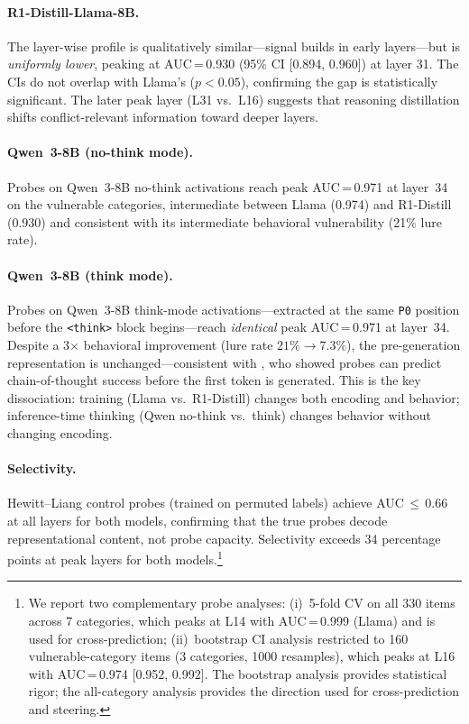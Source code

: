 \documentclass[accepted]{article}
\newcommand{\pzero}{\texttt{P0}}
\begin{document}
\paragraph{R1-Distill-Llama-8B.}  The layer-wise profile is qualitatively
similar---signal builds in early layers---but is \emph{uniformly lower},
peaking at AUC\,=\,0.930 (95\% CI [0.894, 0.960]) at layer 31.  The CIs
do not overlap with Llama's ($p < 0.05$), confirming the gap is
statistically significant.  The later peak layer (L31 vs.\ L16) suggests
that reasoning distillation shifts conflict-relevant information toward
deeper layers.

\paragraph{Qwen~3-8B (no-think mode).}  Probes on Qwen~3-8B no-think
activations reach peak AUC\,=\,0.971 at layer~34 on the vulnerable
categories, intermediate between Llama (0.974) and R1-Distill (0.930)
and consistent with its intermediate behavioral vulnerability (21\% lure
rate).

\paragraph{Qwen~3-8B (think mode).}  Probes on Qwen~3-8B think-mode
activations---extracted at the same \pzero{} position before the
\texttt{<think>} block begins---reach \emph{identical} peak
AUC\,=\,0.971 at layer~34.  Despite a 3$\times$ behavioral improvement
(lure rate $21\% \to 7.3\%$), the pre-generation representation is
unchanged---consistent with \citet{afzal2025knowing}, who showed probes
can predict chain-of-thought success before the first token is generated.
This is the key dissociation: training (Llama vs.\ R1-Distill)
changes both encoding and behavior; inference-time thinking (Qwen no-think
vs.\ think) changes behavior without changing encoding.

\paragraph{Selectivity.}  Hewitt--Liang control probes (trained on
permuted labels) achieve AUC\,$\leq$\,0.66 at all layers for both models,
confirming that the true probes decode representational content, not
probe capacity.  Selectivity exceeds 34 percentage points at peak layers
for both models.\footnote{We report two complementary probe analyses:
  (i)~5-fold CV on all 330 items across 7 categories, which peaks at L14
  with AUC\,=\,0.999 (Llama) and is used for cross-prediction;
  (ii)~bootstrap CI analysis restricted to 160 vulnerable-category items
  (3 categories, 1000 resamples), which peaks at L16 with
  AUC\,=\,0.974 [0.952, 0.992].  The bootstrap analysis provides
  statistical rigor; the all-category analysis provides the direction
  used for cross-prediction and steering.}
\end{document}

